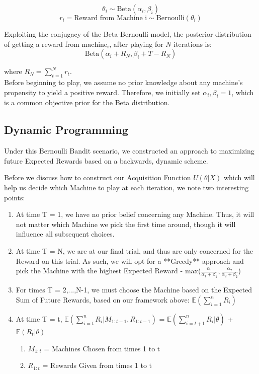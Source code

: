 \documentclass{article}
\begin{document}
$$\theta_i \sim \text{Beta}(\alpha_i, \beta_i)$$
$$r_i = \text{Reward from Machine i} \sim \text{Bernoulli}(\theta_i)$$

Exploiting the conjugacy of the Beta-Bernoulli model, the posterior distribution of getting a reward from $\text{machine}_i$, after playing for $N$ iterations is:
$$\text{Beta}(\alpha_i + R_{N}, \beta_i + T - R_{N})$$

where $R_{N} = \sum_{t=1}^{N}r_{t}$.\\

Before beginning to play, we assume no prior knowledge about any machine's propensity to yield a positive reward. Therefore, we initially set $\alpha_i, \beta_i = 1$, which is a common objective prior for the Beta distribution.\\

\subsection{Dynamic Programming}

Under this Bernoulli Bandit scenario, we constructed an approach to maximizing future Expected Rewards based on a backwards, dynamic scheme.

Before we discuss how to construct our Acquisition Function $U(\theta|X)$ which will help us decide which Machine to play at each iteration, we note two interesting points:\\

\begin{enumerate}
\item At time T = 1, we have no prior belief concerning any Machine. Thus, it will not matter which Machine we pick the first time around, though it will influence all subsequent choices.
\item At time T = N, we are at our final trial, and thus are only concerned for the Reward on this trial. As such, we will opt for a **Greedy** approach and pick the Machine with the highest Expected Reward - max($\frac{\alpha_1}{\alpha_1 + \beta_1}, \frac{\alpha_2}{\alpha_2 + \beta_2}$)
\item For times T = 2,...,N-1, we must choose the Machine based on the Expected Sum of Future Rewards, based on our framework above: $\mathbb{E}(\displaystyle\sum_{i=1}^{n} R_i)$\\
\item At time T = t, $\mathbb{E}(\displaystyle\sum_{i=t}^{n} R_i|M_{1:t-1}, R_{1:t-1})$ = $\mathbb{E}(\displaystyle\sum_{i=t+1}^{n} R_i|\theta)$ + $\mathbb{E}(R_t|\theta)$ 
	\begin{enumerate}
	\item $M_{1:t}$ = Machines Chosen from times 1 to t 
	\item $R_{1:t}$ = Rewards Given from times 1 to t
	\end{enumerate}
\end{enumerate}
\end{document}
